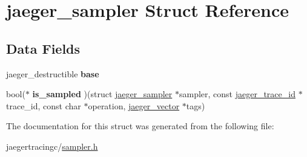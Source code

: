 \hypertarget{structjaeger__sampler}{}\section{jaeger\+\_\+sampler Struct Reference}
\label{structjaeger__sampler}
\subsection*{Data Fields}
\begin{DoxyCompactItemize}
\item 
\mbox{\label{structjaeger__sampler_a35d9c3302303573eb173fcee2eb54485}} 
jaeger\+\_\+destructible {\bfseries base}
\item 
\mbox{\label{structjaeger__sampler_a3ae4ba99898464d4c62d7c69c6d306d9}} 
bool($\ast$ {\bfseries is\+\_\+sampled} )(struct \mbox{\hyperlink{structjaeger__sampler}{jaeger\+\_\+sampler}} $\ast$sampler, const \mbox{\hyperlink{structjaeger__trace__id}{jaeger\+\_\+trace\+\_\+id}} $\ast$trace\+\_\+id, const char $\ast$operation, \mbox{\hyperlink{structjaeger__vector}{jaeger\+\_\+vector}} $\ast$tags)
\end{DoxyCompactItemize}


The documentation for this struct was generated from the following file\+:\begin{DoxyCompactItemize}
\item 
jaegertracingc/\mbox{\hyperlink{sampler_8h}{sampler.\+h}}\end{DoxyCompactItemize}
